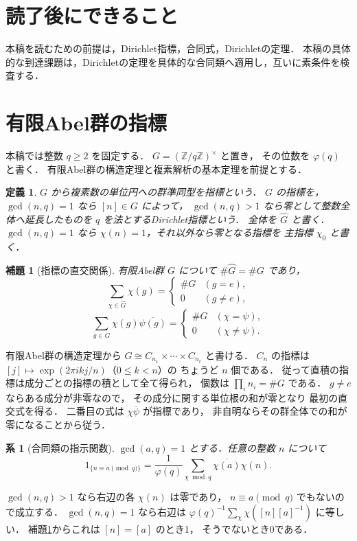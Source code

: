 \documentclass[a5paper,10pt,onecolumn]{jsarticle}
\makeatletter
\theoremstyle{mathnotetheorem}
\newtheorem{definition}[theorem]{定義}
\newtheorem{lemma}[theorem]{補題}
\newtheorem{corollary}[theorem]{系}
\renewcommand{\proofname}{証明}
\renewenvironment{proof}[1][\proofname]{%
  \par\pushQED{\qed}\normalfont\topsep4\p@\@plus2\p@\relax
  \trivlist\item[\hskip\labelsep\bfseries #1]\ignorespaces
}{\popQED\endtrivlist\@endpefalse}
\makeatother
\begin{document}
\section*{読了後にできること}
本稿を読むための前提は，Dirichlet指標，合同式，Dirichletの定理．
本稿の具体的な到達課題は，Dirichletの定理を具体的な合同類へ適用し，互いに素条件を検査する．

\section{有限Abel群の指標}

本稿では整数 $q\ge2$ を固定する．
$G=(\mathbb Z/q\mathbb Z)^\times$ と置き，
その位数を $\varphi(q)$ と書く．
有限Abel群の構造定理と複素解析の基本定理を前提とする．

\begin{definition}
$G$ から複素数の単位円への群準同型を指標という．
$G$ の指標を，$\gcd(n,q)=1$ なら $[n]\in G$ によって，
$\gcd(n,q)>1$ なら零として整数全体へ延長したものを
\emph{$q$ を法とするDirichlet指標}という．
全体を $\widehat G$ と書く．
$\gcd(n,q)=1$ なら $\chi(n)=1$，それ以外なら零となる指標を
主指標 $\chi_0$ と書く．
\end{definition}

\begin{lemma}[指標の直交関係]\label{lem:orth}
有限Abel群 $G$ について $\#\widehat G=\#G$ であり，
\[
 \sum_{\chi\in\widehat G}\chi(g)
 =\begin{cases}\#G&(g=e),\\0&(g\ne e),\end{cases}
\]
\[
 \sum_{g\in G}\chi(g)\overline{\psi(g)}
 =\begin{cases}\#G&(\chi=\psi),\\0&(\chi\ne\psi).\end{cases}
\]
\end{lemma}
\begin{proof}
有限Abel群の構造定理から
$G\cong C_{n_1}\times\cdots\times C_{n_r}$ と書ける．
$C_n$ の指標は
$[j]\mapsto\exp(2\pi ikj/n)$（$0\le k<n$）の
ちょうど $n$ 個である．
従って直積の指標は成分ごとの指標の積として全て得られ，
個数は $\prod_i n_i=\#G$ である．
$g\ne e$ ならある成分が非零なので，
その成分に関する単位根の和が零となり
最初の直交式を得る．
二番目の式は $\chi\overline\psi$ が指標であり，
非自明ならその群全体での和が零になることから従う．
\end{proof}

\begin{corollary}[合同類の指示関数]\label{cor:indicator}
$\gcd(a,q)=1$ とする．任意の整数 $n$ について
\[
 1_{\{n\equiv a\pmod q\}}
 =\frac1{\varphi(q)}
 \sum_{\chi\bmod q}\overline{\chi(a)}\chi(n).
\]
\end{corollary}
\begin{proof}
$\gcd(n,q)>1$ なら右辺の各 $\chi(n)$ は零であり，
$n\equiv a\pmod q$ でもないので成立する．
$\gcd(n,q)=1$ なら右辺は
$\varphi(q)^{-1}\sum_\chi\chi([n][a]^{-1})$
に等しい．
補題\ref{lem:orth}からこれは $[n]=[a]$ のとき1，
そうでないとき0である．
\end{proof}
\end{document}
